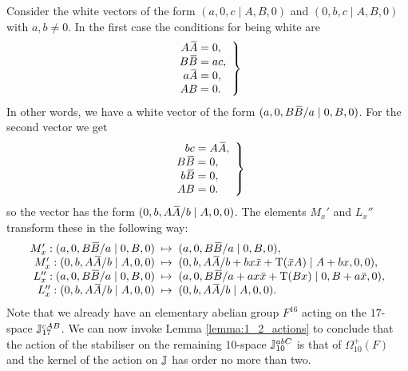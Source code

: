     Consider the white vectors of the form $(a,0,c\mid A,B,0)$ and $(0,b,c\mid A,B,0)$ with
    $a,b \neq 0$. In the first case the conditions for being white are
    \begin{equation*}
        \left.
            \begin{array}{r@{\;}c@{\;}l}
                A\ovA  & = & 0,\\
                B\ovB  & = & ac, \\
                a\ovA  & = & 0, \\
                AB & = & 0.
            \end{array}
        \right\}
    \end{equation*}
    In other words, we have a white vector of the form
    $(a,0,B\mathord{\mbox{\hspace*{0pt}}\,\overline{\!B\!\!\;}\!\:}\mbox{\hspace*{0pt}} /a\mid 0,B,0)$. For the second vector we get
    \begin{equation*}
        \left.
            \begin{array}{r@{\;}c@{\;}l}
                bc & = & A\ovA , \\
                B\ovB  & = & 0, \\
                b\ovB  & = & 0, \\
                AB & = & 0. \\
            \end{array}
        \right\}
    \end{equation*}
    so the vector has the form $(0,b,A\mathord{\mbox{\hspace*{0pt}}\,\overline{\!A\!\!\;}\!\:}\mbox{\hspace*{0pt}} /b\mid A,0,0)$. The elements $M_x'$ and $L_x''$
    transform these in the following way:
    \begin{equation*}
        \begin{array}{r@{\;\;}c@{\;\;}l}
            M_x': (a,0,B\ovB /a\mid 0,B,0) & \mapsto &
            (a,0,B\ovB /a\mid 0,B,0), \\
            M_x': (0,b,A\ovA /b\mid A,0,0) & \mapsto &
            (0,b,A\ovA /b+bx\ovx  + \Tr(\ovx A) \mid A+bx,0,0), \\
            L_x'': (a,0,B\ovB /a\mid 0,B,0) & \mapsto &
            (a,0,B\ovB /a+ax\ovx +\Tr(Bx)\mid 0,B+a\ovx , 0), \\
            L_x'': (0,b,A\ovA /b\mid A,0,0) & \mapsto &
            (0,b,A\ovA /b\mid A,0,0).
        \end{array}
    \end{equation*}
    Note that we already have an elementary abelian group $F^{16}$ acting
    on the $17$-space \mbox{$\mathbb{J}_{17}^{cAB}$}. We can now 
    invoke Lemma \ref{lemma:1_2_actions} to conclude that the action of the stabiliser
    on the remaining $10$-space $\mathbb{J}_{10}^{abC}$ is that of $\Omega_{10}^+(F)$ and the 
    kernel of the action on $\mathbb{J}$ has order no more than two. 

